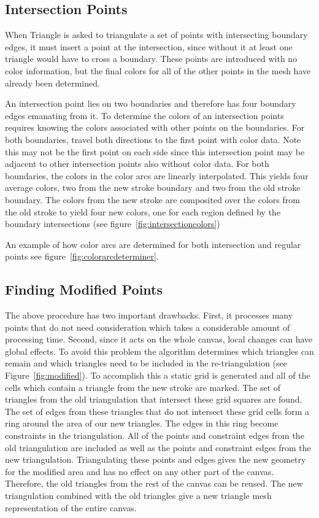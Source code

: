 \documentclass[review]{acmsiggraph}
\begin{document}
\subsection{Intersection Points}

When Triangle is asked to triangulate a set of points with intersecting boundary edges, it must
insert a point at the intersection, since without it at least one triangle would have to
cross a boundary. These points are introduced with no color information, but the final colors for 
all of the other points in the mesh have already been determined.

An intersection point lies on two boundaries and therefore has four boundary edges emanating from it. 
To determine the colors of an intersection points requires knowing the colors associated with
other points on the boundaries. For both boundaries, travel both directions to the first point with color data. Note this may not
be the first point on each side since this intersection point may be adjacent to other intersection
points also without color data. For both boundaries, the colors in the color arcs are linearly interpolated. 
This yields four average colors, two from the new stroke boundary and two from the old stroke boundary.
The colors from the new stroke are composited over the colors from the old stroke to yield four new
colors, one for each region defined by the boundary intersections (see figure~\ref{fig:intersectioncolors}) 

An example of how color arcs are determined for both intersection and regular points see figure~\ref{fig:colorarcdeterminer}.

\subsection{Finding Modified Points}
The above procedure has two important drawbacks. First, it processes many points that do not need
consideration which takes a considerable amount of processing time. Second, since it acts on the whole
canvas, local changes can have global effects. To avoid this problem the algorithm determines
which triangles can remain
and which triangles need to be included in the re-triangulation (see Figure~\ref{fig:modified}). To accomplish this a static grid
is generated and all of the cells which contain a triangle from the new stroke are marked. 
The set of triangles from the old triangulation that intersect these grid squares are found.
The set of edges from these triangles that do not intersect these grid cells form a ring
around the area of our new triangles. The edges in this ring become constraints
in the triangulation. All of the points and constraint edges from the old triangulation are
included as well as the points and constraint edges from the new triangulation. Triangulating
these points and edges gives the new geometry for the modified area and has no effect on any
other part of the canvas. Therefore, the old triangles from the rest of the canvas can be reused. 
The new triangulation combined with the old triangles give a new triangle mesh representation of the entire canvas.
\end{document}
